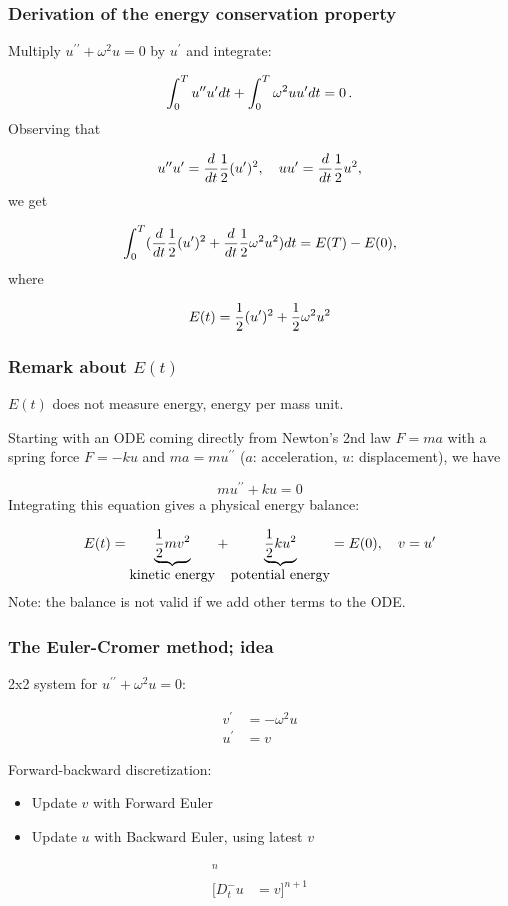 \documentclass{beamer}
\begin{document}
\begin{frame}
\frametitle{Derivation of the energy conservation property}

Multiply $u^{\prime\prime}+\omega^2u=0$ by $u^{\prime}$ and integrate:

\[ \int_0^T u^{\prime\prime}u^{\prime} dt + \int_0^T\omega^2 u u^{\prime} dt = 0\tp\]
Observing that

\[ u^{\prime\prime}u^{\prime} = \frac{d}{dt}\half(u^{\prime})^2,\quad uu^{\prime} = \frac{d}{dt} {\half}u^2,\]
we get

\[
\int_0^T (\frac{d}{dt}\half(u^{\prime})^2 + \frac{d}{dt} \half\omega^2u^2)dt = E(T) - E(0),
\]
where

\[
E(t) = \half(u^{\prime})^2 + \half\omega^2u^2
\]
\end{frame}

\begin{frame}
\frametitle{Remark about $E(t)$}

$E(t)$ does not measure energy, energy per mass unit.

Starting with an ODE coming directly from Newton's 2nd law $F=ma$ with
a spring force $F=-ku$ and $ma=mu^{\prime\prime}$ ($a$: acceleration, $u$: displacement),
we have

\[ mu^{\prime\prime} + ku = 0\]
Integrating this equation gives a physical energy balance:

\[
E(t) = \underbrace{{\half}mv^2}_{\hbox{kinetic energy} }
+ \underbrace{{\half}ku^2}_{\hbox{potential energy}} = E(0),\quad v=u^{\prime}
\]
Note: the balance is not valid if we add other terms to the ODE.
\end{frame}

\begin{frame}
\frametitle{The Euler-Cromer method; idea}

\label{vib:model2x2:EulerCromer}

2x2 system for $u^{\prime\prime}+\omega^2u=0$:

\begin{align*}
v^{\prime} &= -\omega^2u\\ 
u^{\prime} &= v
\end{align*}

Forward-backward discretization:

\begin{itemize}
  \item Update $v$ with Forward Euler

  \item Update $u$ with Backward Euler, using latest $v$
\end{itemize}

\noindent
\begin{align}
[D_t^+v &= -\omega^2u]^n\\ 
[D_t^-u &= v]^{n+1}
\end{align}
\end{frame}
\end{document}
